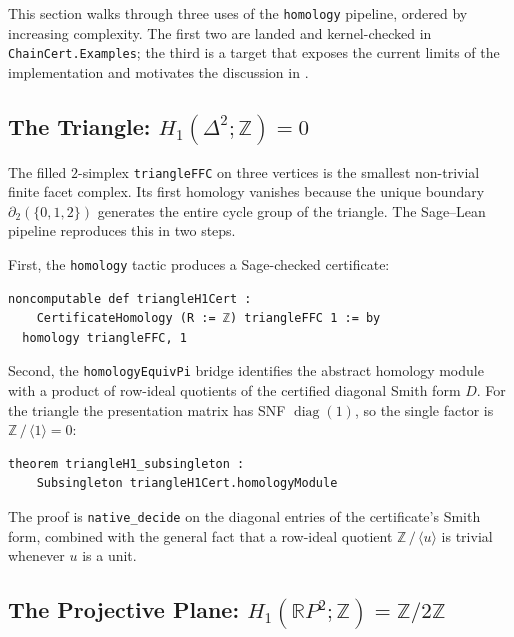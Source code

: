 \documentclass[11pt]{article}
\theoremstyle{plain}
\theoremstyle{definition}
\theoremstyle{remark}
\newcommand{\lean}[1]{\lstinline[language=lean]|#1|}
\begin{document}
This section walks through three uses of the \lean{homology} pipeline,
ordered by increasing complexity. The first two are landed and
kernel-checked in \texttt{ChainCert.Examples}; the third is a target that
exposes the current limits of the implementation and motivates the
discussion in .

\subsection{The Triangle: \texorpdfstring{$H_1(\Delta^2;\mathbb{Z})=0$}{H1(Triangle)=0}}

The filled \(2\)-simplex \lean{triangleFFC} on three vertices is the
smallest non-trivial finite facet complex. Its first homology vanishes
because the unique boundary \(\partial_2(\{0,1,2\})\) generates the entire
cycle group of the triangle. The Sage--Lean pipeline reproduces this in
two steps.

First, the \lean{homology} tactic produces a Sage-checked certificate:
\begin{lstlisting}[caption={Triangle $H_1$ certificate.},label={lst:triangle-cert}]
noncomputable def triangleH1Cert :
    CertificateHomology (R := ℤ) triangleFFC 1 := by
  homology triangleFFC, 1
\end{lstlisting}

Second, the \texttt{homologyEquivPi} bridge identifies the abstract
homology module with a product of row-ideal quotients of the certified
diagonal Smith form \(D\). For the triangle the presentation matrix has
SNF \(\operatorname{diag}(1)\), so the single factor is
\(\mathbb{Z}\,/\,\langle 1\rangle = 0\):

\begin{lstlisting}[caption={The certified $H_1$ of the triangle is trivial.},label={lst:triangle-subsingleton}]
theorem triangleH1_subsingleton :
    Subsingleton triangleH1Cert.homologyModule
\end{lstlisting}

The proof is \texttt{native\_decide} on the diagonal entries of the
certificate's Smith form, combined with the general fact that a row-ideal
quotient \(\mathbb{Z}\,/\,\langle u\rangle\) is trivial whenever \(u\) is a
unit.

\subsection{The Projective Plane: \texorpdfstring{$H_1(\mathbb{R}P^2;\mathbb{Z})=\mathbb{Z}/2\mathbb{Z}$}{H1(RP2)=Z/2Z}}
\end{document}
